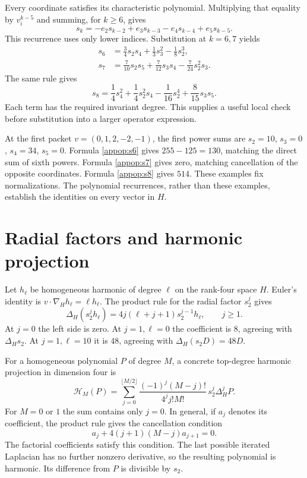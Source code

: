 Every coordinate satisfies its characteristic polynomial. Multiplying that equality by $v_i^{k-5}$ and summing, for $k\ge6$, gives
\begin{equation}\label{appop:newtonrec}
s_k=-e_2s_{k-2}+e_3s_{k-3}-e_4s_{k-4}+e_5s_{k-5}.
\end{equation}
This recurrence uses only lower indices. Substitution at $k=6,7$ yields
\begin{align}
s_6&=\frac34s_2s_4+\frac13s_3^2-\frac18s_2^3,\label{appop:s6}\\
s_7&=\frac7{10}s_2s_5+\frac7{12}s_3s_4
-\frac7{24}s_2^2s_3.\label{appop:s7}
\end{align}
The same rule gives
\begin{equation}\label{appop:s8}
s_8=\frac14s_4^2+\frac14s_2^2s_4
-\frac1{16}s_2^4+\frac8{15}s_3s_5.
\end{equation}
Each term has the required invariant degree. This supplies a useful local check before substitution into a larger operator expression.

At the first packet $v=(0,1,2,-2,-1)$, the first power sums are $s_2=10$, $s_3=0$, $s_4=34$, $s_5=0$. Formula \eqref{appop:s6} gives $255-125=130$, matching the direct sum of sixth powers. Formula \eqref{appop:s7} gives zero, matching cancellation of the opposite coordinates. Formula \eqref{appop:s8} gives $514$. These examples fix normalizations. The polynomial recurrences, rather than these examples, establish the identities on every vector in $H$.

\section{Radial factors and harmonic projection}
Let $h_\ell$ be homogeneous harmonic of degree $\ell$ on the rank-four space $H$. Euler's identity is $v\cdot\nabla_Hh_\ell=\ell h_\ell$. The product rule for the radial factor $s_2^j$ gives
\begin{equation}\label{appop:radial}
\Delta_H(s_2^jh_\ell)
=4j(\ell+j+1)s_2^{j-1}h_\ell,\qquad j\ge1.
\end{equation}
At $j=0$ the left side is zero. At $j=1,\ell=0$ the coefficient is $8$, agreeing with $\Delta_Hs_2$. At $j=1,\ell=10$ it is $48$, agreeing with $\Delta_H(s_2D)=48D$.

For a homogeneous polynomial $P$ of degree $M$, a concrete top-degree harmonic projection in dimension four is
\begin{equation}\label{appop:hprojection}
\mathcal H_M(P)=\sum_{j=0}^{\lfloor M/2\rfloor}
\frac{(-1)^j(M-j)!}{4^j j!M!}\,s_2^j\Delta_H^jP.
\end{equation}
For $M=0$ or $1$ the sum contains only $j=0$. In general, if $a_j$ denotes its coefficient, the product rule gives the cancellation condition
\[
a_j+4(j+1)(M-j)a_{j+1}=0.
\]
The factorial coefficients satisfy this condition. The last possible iterated Laplacian has no further nonzero derivative, so the resulting polynomial is harmonic. Its difference from $P$ is divisible by $s_2$.

